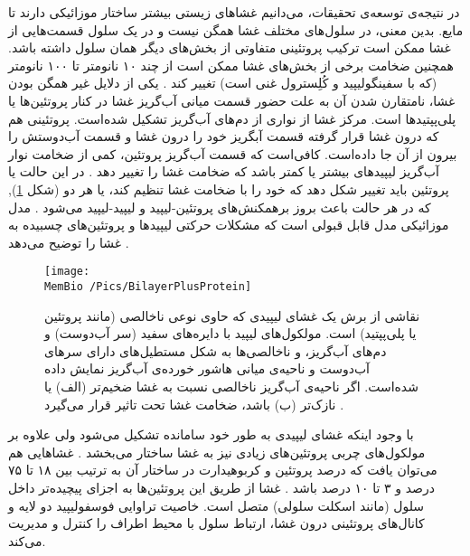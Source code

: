 در نتیجه‌ی توسعه‌ی تحقیقات، می‌دانیم غشا‌های زیستی بیشتر ساختار موزائیکی دارند تا مایع. بدین معنی، در سلول‌های مختلف غشا همگن نیست و در یک سلول قسمت‌هایی از غشا ممکن است  ترکیب پروتئینی متفاوتی از بخش‌های دیگر همان سلول داشته باشد. همچنین ضخامت برخی از بخش‌های غشا ممکن است از چند ۱۰ نانومتر تا ۱۰۰ نانومتر (که با سفینگولیپید
و کُلِسترول غنی است) تغییر کند
\cite{Engelman:2005aa}. یکی از دلایل غیر همگن بودن غشا، نامتقارن شدن آن به علت حضور قسمت میانی آب‌گریز غشا در کنار پروتئین‌ها یا پلی‌پپتیدها
است.  مرکز غشا از نواری از دم‌های آب‌گریز تشکیل شده‌است. پروتئینی هم که درون غشا قرار گرفته قسمت آبگریز خود را درون غشا و قسمت آب‌دوستش را بیرون از آن جا داده‌است. کافی‌است که قسمت آب‌گریز پروتئین،  کمی از ضخامت نوار آب‌گریز لیپید‌های  بیشتر یا کمتر باشد که ضخامت غشا را تغییر دهد
\cite{Mouritsen1984}. 
در این حالت یا پروتئین باید تغییر شکل دهد که خود را با ضخامت غشا تنظیم کند، یا هر دو (شکل 
\ref{fig:BilayerPlusProtein}),
 که در هر حالت باعث بروز برهمکنش‌‌های پروتئین-لیپید و لیپید-لیپید می‌شود
\cite{Huang1986,Aranda-Espinoza1996,Safran2000,Haselwandter2013,Haselwandter-Christoph2013}.
مدل موزائیکی مدل قابل قبولی است که مشکلات حرکتی لیپید‌ها و پروتئین‌های چسبیده به غشا را توضیح می‌دهد
\cite{Simons2000,Simons1997}.


\begin{figure}[h]
\begin{center}
\texttt{[image: \\MemBio /Pics/BilayerPlusProtein]}
\caption{
نقاشی از برش یک غشای لیپیدی که حاوی نوعی ناخالصی (مانند پروتئین یا پلی‌پپتید) است. مولکول‌های لیپید با دایره‌های سفید (سر آب‌دوست) و دم‌های آب‌گریز، و  ناخالصی‌ها به شکل مستطیل‌های دارای سر‌های آب‌دوست و ناحیه‌ی میانی هاشور خورده‌ی آب‌گریز نمایش داده شده‌است. اگر ناحیه‌ی آب‌گریز ناخالصی نسبت به غشا ضخیم‌تر (الف) یا نازک‌تر (ب) باشد، ضخامت غشا تحت تاثیر قرار می‌گیرد
\cite{Mouritsen1984}.
}
\label{fig:BilayerPlusProtein}
\end{center}
\end{figure}





با وجود اینکه غشای لیپیدی به طور خود سامانده
 تشکیل می‌شود ولی علاوه بر مولکول‌های چربی پروتئین‌های زیادی نیز به غشا ساختار می‌بخشد
\cite{wikiCellMembrane}. غشاهایی هم می‌توان یافت که درصد پروتئین و کربوهیدارت در ساختار  آن به ترتیب بین ۱۸ تا ۷۵ درصد و  ۳ تا ۱۰ درصد باشد
\cite{MembraneProteins1972}. 
غشا از طریق این پروتئین‌ها به اجزای پیچیده‌تر داخل سلول (مانند اسکلت سلولی) متصل است. خاصیت تراوایی فوسفولیپید دو لایه و کانال‌های پروتئینی درون غشا، ارتباط سلول با محیط اطراف را کنترل و مدیریت می‌کند.  

